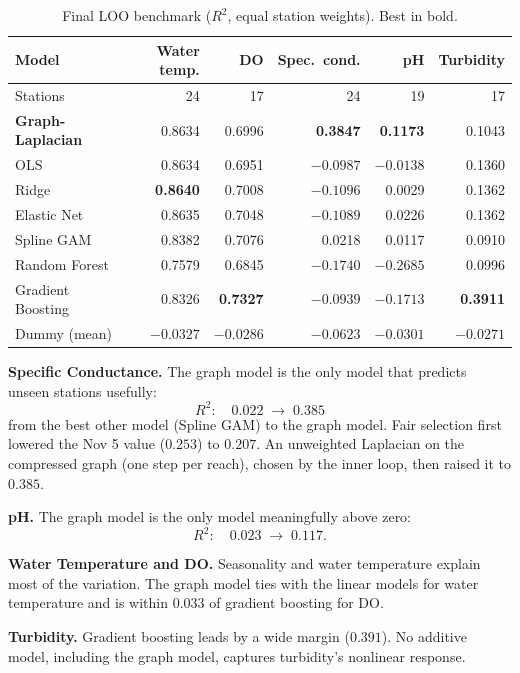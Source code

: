 \documentclass[12pt]{article}
\begin{document}
\begin{table}[H]
\centering
\caption{Final LOO benchmark ($R^2$, equal station weights). Best in bold.}
\label{tab:final}
\begin{tabular}{l rrrrr}
\toprule
Model & Water temp. & DO & Spec.\ cond. & pH & Turbidity \\
\midrule
Stations           & 24 & 17 & 24 & 19 & 17 \\
\midrule
\textbf{Graph-Laplacian} & 0.8634 & 0.6996 & \textbf{0.3847} & \textbf{0.1173} & 0.1043 \\
OLS                & 0.8634 & 0.6951 & $-0.0987$ & $-0.0138$ & 0.1360 \\
Ridge              & \textbf{0.8640} & 0.7008 & $-0.1096$ & 0.0029 & 0.1362 \\
Elastic Net        & 0.8635 & 0.7048 & $-0.1089$ & 0.0226 & 0.1362 \\
Spline GAM         & 0.8382 & 0.7076 & 0.0218 & 0.0117 & 0.0910 \\
Random Forest      & 0.7579 & 0.6845 & $-0.1740$ & $-0.2685$ & 0.0996 \\
Gradient Boosting  & 0.8326 & \textbf{0.7327} & $-0.0939$ & $-0.1713$ & \textbf{0.3911} \\
Dummy (mean)       & $-0.0327$ & $-0.0286$ & $-0.0623$ & $-0.0301$ & $-0.0271$ \\
\bottomrule
\end{tabular}
\end{table}

\textbf{Specific Conductance.} The graph model is the only model that predicts unseen stations
usefully:
\[
  R^2:\quad 0.022 \;\longrightarrow\; 0.385
\]
from the best other model (Spline GAM) to the graph model. Fair selection first lowered the Nov 5
value ($0.253$) to $0.207$. An unweighted Laplacian on the compressed graph (one step per reach),
chosen by the inner loop, then raised it to $0.385$.

\textbf{pH.} The graph model is the only model meaningfully above zero:
\[
  R^2:\quad 0.023 \;\longrightarrow\; 0.117.
\]

\textbf{Water Temperature and DO.} Seasonality and water temperature explain most of the
variation. The graph model ties with the linear models for water temperature and is within $0.033$
of gradient boosting for DO.

\textbf{Turbidity.} Gradient boosting leads by a wide margin ($0.391$). No additive model,
including the graph model, captures turbidity's nonlinear response.
\end{document}
